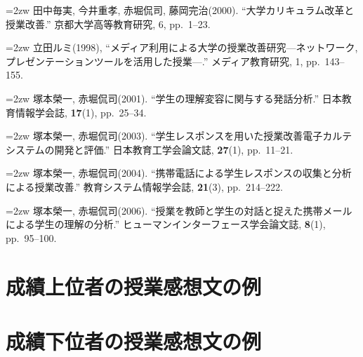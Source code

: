 \documentclass[japanese]{jnlp_1.3a}
\begin{document}
\noindent{}\hangindent=2zw
田中毎実, 今井重孝, 赤堀侃司, 藤岡完治(2000). ``大学カリキュラム改革と授業改善.'' 京都大学高等教育研究, 6, pp.~1--23. 

\noindent{}\hangindent=2zw
立田ルミ(1998), ``メディア利用による大学の授業改善研究—ネットワーク, プレゼンテーションツールを活用した授業—.'' メディア教育研究, 1, pp.~143--155.

\noindent{}\hangindent=2zw
塚本榮一, 赤堀侃司(2001). ``学生の理解変容に関与する発話分析.'' 日本教育情報学会誌, \textbf{17}(1), pp.~25--34.

\noindent{}\hangindent=2zw
塚本榮一, 赤堀侃司(2003). ``学生レスポンスを用いた授業改善電子カルテシステムの開発と評価.'' 日本教育工学会論文誌, \textbf{27}(1), pp.~11--21.

\noindent{}\hangindent=2zw
塚本榮一, 赤堀侃司(2004). ``携帯電話による学生レスポンスの収集と分析による授業改善.'' 教育システム情報学会誌, \textbf{21}(3), pp.~214--222.

\noindent{}\hangindent=2zw
塚本榮一, 赤堀侃司(2006). ``授業を教師と学生の対話と捉えた携帯メールによる学生の理解の分析.'' ヒューマンインターフェース学会論文誌, \textbf{8}(1), pp.~95--100.


\appendix
\section{成績上位者の授業感想文の例}

\begingroup

\label{table_app1}
\endgroup

\clearpage 
\section{成績下位者の授業感想文の例}

\begingroup

\label{table_app2}
\endgroup

\clearpage



\begin{biography}



\end{biography}


\biodate
\end{document}
